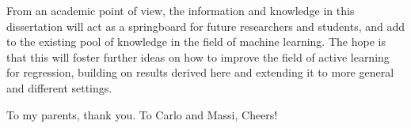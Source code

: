 \begin{impactstatement}
From an academic point of view, the information and knowledge in this
dissertation will act as a springboard for future researchers and students, and
add to the existing pool of knowledge in the field of machine learning. The hope
is that this will foster further ideas on how to improve the field of active
learning for regression, building on results derived here and extending it to
more general and different settings.
\end{impactstatement}

\begin{acknowledgements}
  To my parents, thank you.
  \newline
  \newline
  To Carlo and Massi, Cheers!
\end{acknowledgements}

\setcounter{tocdepth}{2} 

\tableofcontents
\listoffigures
\listoftables

